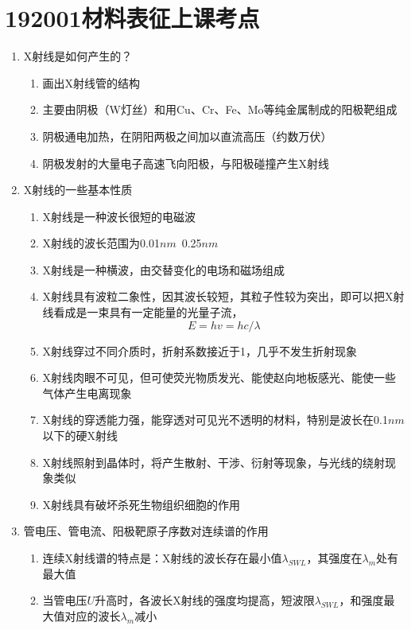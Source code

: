 \documentclass[12pt,a4paper]{article}
\begin{document}
\section{192001材料表征上课考点}
    \begin{enumerate}
        \item X射线是如何产生的？
        \begin{enumerate}
            \item 画出X射线管的结构
            \item 主要由阴极（W灯丝）和用Cu、Cr、Fe、Mo等纯金属制成的阳极靶组成
            \item 阴极通电加热，在阴阳两极之间加以直流高压（约数万伏）
            \item 阴极发射的大量电子高速飞向阳极，与阳极碰撞产生X射线
        \end{enumerate}
        \item X射线的一些基本性质
        \begin{enumerate}
            \item X射线是一种波长很短的电磁波
            \item X射线的波长范围为0.01$nm$~0.25$nm$
            \item X射线是一种横波，由交替变化的电场和磁场组成
            \item X射线具有波粒二象性，因其波长较短，其粒子性较为突出，即可以把X射线看成是一束具有一定能量的光量子流，$$E=h v=h c / \lambda$$
            \item X射线穿过不同介质时，折射系数接近于1，几乎不发生折射现象
            \item X射线肉眼不可见，但可使荧光物质发光、能使赵向地板感光、能使一些气体产生电离现象
            \item X射线的穿透能力强，能穿透对可见光不透明的材料，特别是波长在0.1$nm$以下的硬X射线
            \item X射线照射到晶体时，将产生散射、干涉、衍射等现象，与光线的绕射现象类似
            \item X射线具有破坏杀死生物组织细胞的作用
        \end{enumerate}
        \item 管电压、管电流、阳极靶原子序数对连续谱的作用
            \begin{enumerate}
                \item 连续X射线谱的特点是：X射线的波长存在最小值$\lambda_{SWL}$，其强度在$\lambda_m$处有最大值
                \item 当管电压$U$升高时，各波长X射线的强度均提高，短波限$\lambda_{SWL}$，和强度最大值对应的波长$\lambda_m$减小

\end{enumerate}
\end{enumerate}
\end{document}
